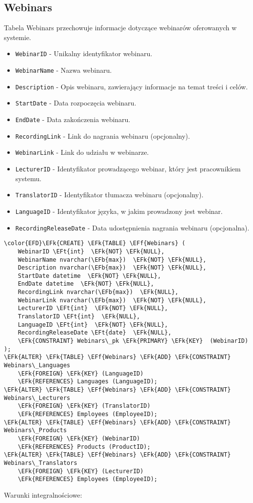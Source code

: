 \documentclass[11pt]{article}
\newcommand{\EFk}[1]{\textcolor{EFk}{\textbf{#1}}} %
\newcommand{\EFb}[1]{\textcolor{EFb}{\textbf{#1}}} %
\newcommand{\EFf}[1]{\textcolor{EFf}{#1}} %
\newcommand{\EFt}[1]{\textcolor{EFt}{\textbf{#1}}} %
\begin{document}
\subsection{Webinars}
\label{sec:orgdbb0d53}
Tabela Webinars przechowuje informacje dotyczące webinarów oferowanych w systemie.
\begin{itemize}
\item \texttt{WebinarID} - Unikalny identyfikator webinaru.
\item \texttt{WebinarName} - Nazwa webinaru.
\item \texttt{Description} - Opis webinaru, zawierający informacje na temat treści i celów.
\item \texttt{StartDate} - Data rozpoczęcia webinaru.
\item \texttt{EndDate} - Data zakończenia webinaru.
\item \texttt{RecordingLink} - Link do nagrania webinaru (opcjonalny).
\item \texttt{WebinarLink} - Link do udziału w webinarze.
\item \texttt{LecturerID} - Identyfikator prowadzącego webinar, który jest pracownikiem systemu.
\item \texttt{TranslatorID} - Identyfikator tłumacza webinaru (opcjonalny).
\item \texttt{LanguageID} - Identyfikator języka, w jakim prowadzony jest webinar.
\item \texttt{RecordingReleaseDate} - Data udostępnienia nagrania webinaru (opcjonalna).
\end{itemize}
\begin{Code}
\begin{Verbatim}
\color{EFD}\EFk{CREATE} \EFk{TABLE} \EFf{Webinars} (
    WebinarID \EFt{int}  \EFk{NOT} \EFk{NULL},
    WebinarName nvarchar(\EFb{max})  \EFk{NOT} \EFk{NULL},
    Description nvarchar(\EFb{max})  \EFk{NOT} \EFk{NULL},
    StartDate datetime  \EFk{NOT} \EFk{NULL},
    EndDate datetime  \EFk{NOT} \EFk{NULL},
    RecordingLink nvarchar(\EFb{max})  \EFk{NULL},
    WebinarLink nvarchar(\EFb{max})  \EFk{NOT} \EFk{NULL},
    LecturerID \EFt{int}  \EFk{NOT} \EFk{NULL},
    TranslatorID \EFt{int}  \EFk{NULL},
    LanguageID \EFt{int}  \EFk{NOT} \EFk{NULL},
    RecordingReleaseDate \EFt{date}  \EFk{NULL},
    \EFk{CONSTRAINT} Webinars\_pk \EFk{PRIMARY} \EFk{KEY}  (WebinarID)
);
\EFk{ALTER} \EFk{TABLE} \EFf{Webinars} \EFk{ADD} \EFk{CONSTRAINT} Webinars\_Languages
    \EFk{FOREIGN} \EFk{KEY} (LanguageID)
    \EFk{REFERENCES} Languages (LanguageID);
\EFk{ALTER} \EFk{TABLE} \EFf{Webinars} \EFk{ADD} \EFk{CONSTRAINT} Webinars\_Lecturers
    \EFk{FOREIGN} \EFk{KEY} (TranslatorID)
    \EFk{REFERENCES} Employees (EmployeeID);
\EFk{ALTER} \EFk{TABLE} \EFf{Webinars} \EFk{ADD} \EFk{CONSTRAINT} Webinars\_Products
    \EFk{FOREIGN} \EFk{KEY} (WebinarID)
    \EFk{REFERENCES} Products (ProductID);
\EFk{ALTER} \EFk{TABLE} \EFf{Webinars} \EFk{ADD} \EFk{CONSTRAINT} Webinars\_Translators
    \EFk{FOREIGN} \EFk{KEY} (LecturerID)
    \EFk{REFERENCES} Employees (EmployeeID);
\end{Verbatim}
\end{Code}
Warunki integralnościowe:
\end{document}
